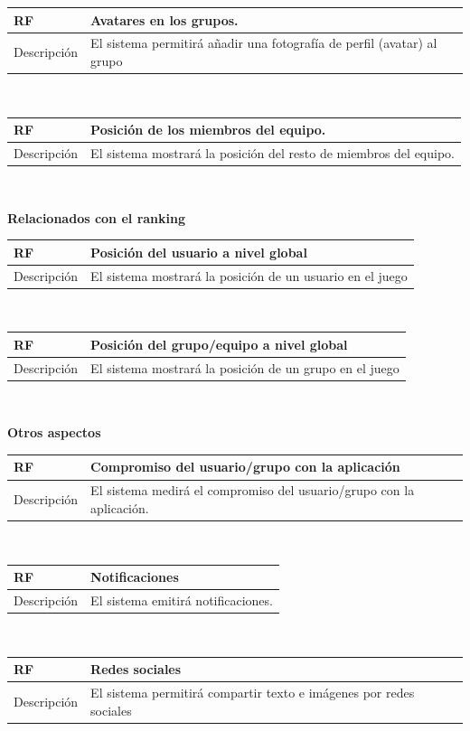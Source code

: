 \documentclass[twoside]{report}
\newcommand\addrow[2]{#1 &#2\\ }
\newcommand\addheading[2]{#1 &#2\\ \hline}
\newcommand\tabularhead{\begin{tabular}{lp{0.7\textwidth}}
\hline
}
\newenvironment{req}{\tabularhead}
{\hline\end{tabular}}
\begin{document}
\begin{req}
	\addheading{\textbf{RF\arabic{functionalRequirements}}}{Avatares en los grupos.}
	\addrow{Descripción}{El sistema permitirá añadir una fotografía de perfil (avatar) al grupo}
\end{req}\\

\begin{req}
	\addheading{\textbf{RF\arabic{functionalRequirements}}}{Posición de los miembros del equipo.}
	\addrow{Descripción}{El sistema mostrará la posición del resto de miembros del equipo. }
\end{req}\\

\textbf{Relacionados con el ranking}\\

\begin{req}
	\addheading{\textbf{RF\arabic{functionalRequirements}}}{Posición del usuario a nivel global}
	\addrow{Descripción}{El sistema mostrará la posición de un usuario en el juego}
\end{req}\\

\begin{req}
	\addheading{\textbf{RF\arabic{functionalRequirements}}}{Posición del grupo/equipo a nivel global}
	\addrow{Descripción}{El sistema mostrará la posición de un grupo en el juego}
\end{req}\\

\textbf{Otros aspectos}\\

\begin{req}
	\addheading{\textbf{RF\arabic{functionalRequirements}}}{Compromiso del usuario/grupo con la aplicación}
	\addrow{Descripción}{El sistema medirá el compromiso del usuario/grupo con la aplicación.}
\end{req}\\

\begin{req}
	\addheading{\textbf{RF\arabic{functionalRequirements}}}{Notificaciones}
	\addrow{Descripción}{El sistema emitirá notificaciones.}
\end{req}\\

\begin{req}
	\addheading{\textbf{RF\arabic{functionalRequirements}}}{Redes sociales}
	\addrow{Descripción}{El sistema permitirá compartir texto e imágenes por redes sociales}
\end{req}\\
\end{document}
